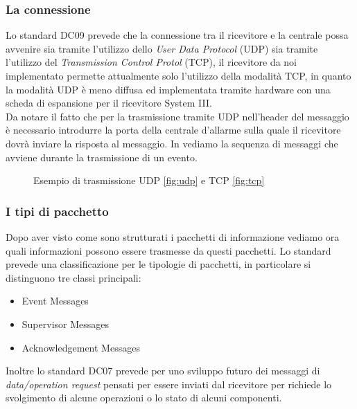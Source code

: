 \subsubsection{La connessione}
Lo standard DC09 prevede che la connessione tra il ricevitore e la centrale possa avvenire sia tramite l'utilizzo dello \emph{User Data Protocol} (UDP) sia tramite l'utilizzo del \emph{Transmission Control Protol} (TCP), il ricevitore da noi implementato permette attualmente solo l'utilizzo della modalità TCP, in quanto la modalità UDP è meno diffusa ed implementata tramite hardware con una scheda di espansione per il ricevitore System III.\\
Da notare il fatto che per la trasmissione tramite UDP nell'header del messaggio è necessario introdurre la porta della centrale d'allarme sulla quale il ricevitore dovrà inviare la risposta al messaggio.
In  vediamo la sequenza di messaggi che avviene durante la trasmissione di un evento.
\begin{figure}
	\centering
	\hspace{5mm}
	\caption{Esempio di trasmissione UDP \ref{fig:udp} e TCP \ref{fig:tcp} }\label{fig:transmission}
\end{figure}
\subsubsection{I tipi di pacchetto}
Dopo aver visto come sono strutturati i pacchetti di informazione vediamo ora quali informazioni possono essere trasmesse da questi pacchetti.
Lo standard prevede una classificazione per le tipologie di pacchetti, in particolare si distinguono tre classi principali:
\begin{itemize}
	\item Event Messages
	\item Supervisor Messages
	\item Acknowledgement Messages
\end{itemize}
Inoltre lo standard DC07 prevede per uno sviluppo futuro dei messaggi di \emph{data/operation request} pensati per essere inviati dal ricevitore per richiede lo svolgimento di alcune operazioni o lo stato di alcuni componenti.
